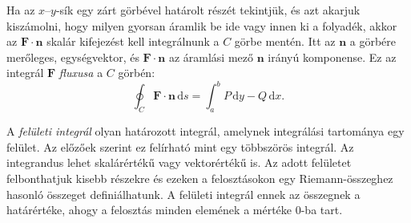 \documentclass[DIV=15,appendixprefix]{scrreprt}
\theoremstyle{definition}
\theoremstyle{remark}
\begin{document}
Ha az $ x $--$ y $-sík egy zárt görbével határolt részét tekintjük, és azt akarjuk kiszámolni, hogy
milyen gyorsan áramlik be ide vagy innen ki a folyadék, akkor az $ \mathbf{ F } \cdot \mathbf{ n } $
skalár kifejezést kell integrálnunk a $ C $ görbe mentén. Itt az $ \mathbf{ n }$ a görbére
merőleges,  egységvektor, és $ \mathbf{ F } \cdot \mathbf{ n }$ az áramlási
mező $ \mathbf{ n } $ irányú komponense. Ez az integrál $ \mathbf{ F } $ \emph{fluxusa} a $ C $
görbén:
\begin{equation*}
	\oint_{ C } \mathbf{ F } \cdot \mathbf{ n } \, \mathrm{ d } s = \int_{ a }^{ b } P \,
	\mathrm{ d } y - Q \, \mathrm{ d } x.
\end{equation*}
%

A \emph{felületi integrál} olyan határozott integrál, amelynek integrálási tartománya egy felület.
Az előzőek szerint ez felírható mint egy többszörös integrál. Az integrandus lehet skalárértékű
vagy vektorértékű is. Az adott felületet felbonthatjuk kisebb részekre és ezeken a felosztásokon egy
Riemann-összeghez hasonló összeget definiálhatunk. A felületi integrál ennek az összegnek a
határértéke, ahogy a felosztás minden elemének a mértéke 0-ba tart.
\end{document}
